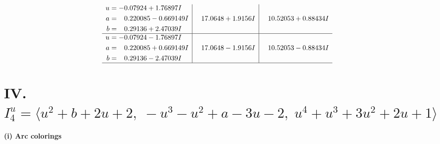 \documentclass[1p]{elsarticle_modified}
\theoremstyle{definition}
\begin{document}
$$\begin{array}{c|c|c}
\begin{aligned}
u &= -0.07924 + 1.76897 I \\
a &= \phantom{-}0.220085 - 0.669149 I \\
b &= \phantom{-}0.29136 + 2.47039 I\end{aligned}
 & \phantom{-}17.0648 + 1.9156 I & \phantom{-}10.52053 + 0.88434 I \\ \hline\begin{aligned}
u &= -0.07924 - 1.76897 I \\
a &= \phantom{-}0.220085 + 0.669149 I \\
b &= \phantom{-}0.29136 - 2.47039 I\end{aligned}
 & \phantom{-}17.0648 - 1.9156 I & \phantom{-}10.52053 - 0.88434 I\\
 \hline 
 \end{array}$$\newpage\newpage\renewcommand{\arraystretch}{1}
\centering \section*{IV. $I^u_{4}= \langle u^2+b+2 u+2,\;- u^3- u^2+a-3 u-2,\;u^4+u^3+3 u^2+2 u+1 \rangle$}
\flushleft \textbf{(i) Arc colorings}\\
\end{document}
